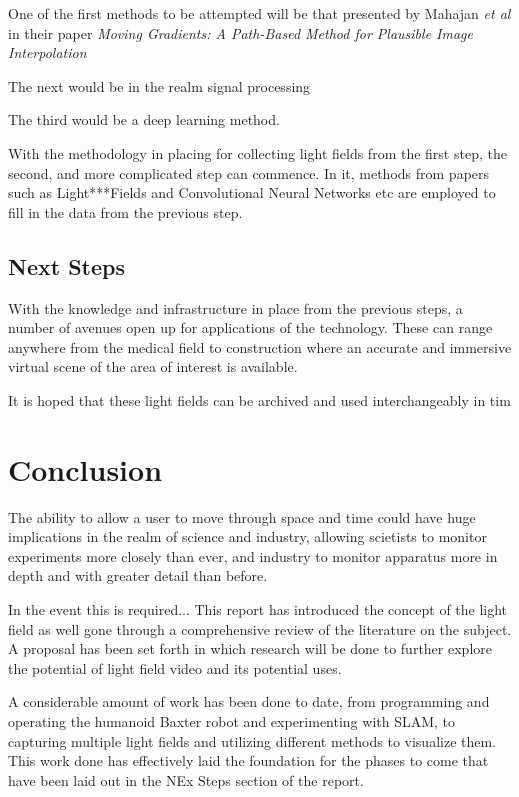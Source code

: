 \documentclass[12pt]{report}
\begin{document}
One of the first methods to be attempted will be that presented by Mahajan \emph{et al} in their paper \emph{Moving Gradients: A Path-Based Method for Plausible Image Interpolation}

The next would be in the realm signal processing

The third would be a deep learning method. 

With the methodology in placing for collecting light fields from the first step, the second, and more complicated step can commence. In it, methods from papers such as Light***Fields and Convolutional Neural Networks etc are employed to fill in the data from the previous step.

\section{Next Steps}

With the knowledge and infrastructure in place from the previous steps, a number of avenues open up for applications of the technology. These can range anywhere from the medical field to construction where an accurate and immersive virtual scene of the area of interest is available.

It is hoped that these light fields can be archived and used interchangeably in tim

\chapter{Conclusion}

The ability to allow a user to move through space and time could have huge implications in the realm of science and industry, allowing scietists to monitor experiments more closely than ever, and industry to monitor apparatus more in depth and with greater detail than before.

In the event this is required...
This report has introduced the concept of the light field as well gone through a comprehensive review of the literature on the subject. A proposal has been set forth in which research will be done to further explore the potential of light field video and its potential uses. 

A considerable amount of work has been done to date, from programming and operating the humanoid Baxter robot and experimenting with SLAM, to capturing multiple light fields and utilizing different methods to visualize them. This work done has effectively laid the foundation for the phases to come that have been laid out in the NEx Steps section of the report.
\end{document}
